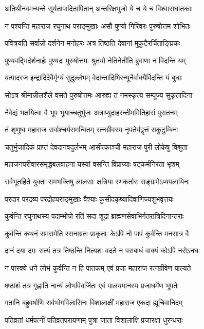 \twolineshloka
{अतिथीनवमन्यन्ते सूर्यतापादितापितान्}
{अन्तरिक्षभुजो ये च ये च विश्वासघातकाः}%

\twolineshloka
{न पश्यन्ति महाराज रघुनाथ पराङ्मुखाः}
{असौ पुण्यो गिरिवरः पुरुषोत्तम शोभितः}%

\twolineshloka
{पवित्रयति सर्वान्नो दर्शनेन मनोहरः}
{अत्र तिष्ठति देवानां मुकुटैरर्चिताङ्घ्रिकः}%

\twolineshloka
{पुण्यवद्भिर्दर्शनार्हः पुण्यदः पुरुषोत्तमः}
{श्रुतयो नेतिनेतीति ब्रुवाणा न विदन्ति यम्}%

\twolineshloka
{यत्पादरज इन्द्रादिदेवैर्मृग्यं सुदुर्ल्लभम्}
{वेदान्तादिभिरन्यूनैर्वाक्यैर्विदन्ति यं बुधाः}%

\twolineshloka
{सोऽत्र श्रीमान्नीलशैले वसते पुरुषोत्तमः}
{आरुह्य तं नमस्कृत्य सम्पूज्य सुकृतादिना}%

\twolineshloka
{नैवेद्यं भक्षयित्वा वै भूप भूयाच्चतुर्भुजः}
{अत्राप्युदाहरन्तीममितिहासं पुरातनम्}%

\twolineshloka
{तं शृणुष्व महाराज सर्वाश्चर्यसमन्वितम्}
{रत्नग्रीवस्य नृपतेर्यद्वृत्तं सकुटुम्बिनः}%

\twolineshloka
{चतुर्भुजादिकं प्राप्तं देवदानवदुर्लभम्}
{आसीत्काञ्ची महाराज पुरी लोकेषु विश्रुता}%

\twolineshloka
{महाजनपरीवारसमृद्धबलवाहना}
{यस्यां वसन्ति विप्राग्र्याः षट्कर्मनिरता भृशम्}%

\twolineshloka
{सर्वभूतहिते युक्ता रामभक्तिषु लालसाः}
{क्षत्रिया रणकर्तारः सङ्ग्रामेऽप्यपलायिनः}%

\twolineshloka
{परदार परद्रव्य परद्रोहपराङ्मुखाः}
{वैश्याः कुसीदकृष्यादिवाणिज्यशुभवृत्तयः}%

\twolineshloka
{कुर्वन्ति रघुनाथस्य पदाम्भोजे रतिं सदा}
{शूद्रा ब्राह्मणसेवाभिर्गतरात्रिदिनान्तराः}%

\twolineshloka
{कुर्वन्ति कथनं रामरामेति रसनाग्रतः}
{प्राकृताः केऽपि नो पापं कुर्वन्ति मनसात्र वै}%

\twolineshloka
{दानं दया दमः सत्यं तत्र तिष्ठन्ति नित्यशः}
{वदते न पराबाधं वाक्यं कोऽपि नरोऽनघः}%

\twolineshloka
{न पारक्ये धने लोभं कुर्वन्ति न हि पातकम्}
{एवं प्रजा महाराज रत्नग्रीवेण पाल्यते}%

\twolineshloka
{षष्ठांशं तत्र गृह्णाति नान्यं लोभविवर्जितः}
{एवं पालयमानस्य प्रजाधर्मेण भूपतेः}%

\twolineshloka
{गतानि बहुवर्षाणि सर्वभोगविलासिनः}
{विशालाक्षीं महाराज एकदा ह्यूचिवानिदम्}%

\twolineshloka
{पतिव्रतां धर्मपत्नीं पतिव्रतपरायणाम्}
{पुत्रा जाता विशालाक्षि प्रजारक्षा धुरन्धराः}%

